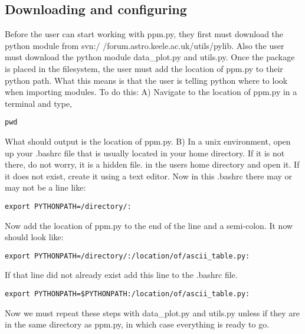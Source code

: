 \subsection{Downloading and configuring}
Before the user can start working with ppm.py, they first must download the python 
module from svn:/ /forum.astro.keele.ac.uk/utils/pylib.  Also the user must download the python module data\_plot.py and utils.py. Once the package is placed in the filesystem, the user must add the location
of ppm.py to their python path.  What this means is that the user is telling python where to look when importing modules.
To do this:
\newline
A) Navigate to the location of ppm.py in a terminal and type,

\begin{verbatim}
pwd
\end{verbatim}

What should output is the location of ppm.py.
\newline
B) In a unix environment, open up your .bashrc file that is usually located in your home directory.  If it is not there, do not worry, it is a hidden file.
in the users home directory and open it.  If it does not exist, create it using a text editor.
Now in this .bashrc there may or may not be a line like:

\begin{verbatim}
export PYTHONPATH=/directory/:
\end{verbatim}

Now add the location of ppm.py to the end of the line and a semi-colon.  It now should look like:

\begin{verbatim}
export PYTHONPATH=/directory/:/location/of/ascii_table.py:
\end{verbatim}

If that line did not already exist add this line to the .bashrc file.

\begin{verbatim}
export PYTHONPATH=$PYTHONPATH:/location/of/ascii_table.py:
\end{verbatim}

Now we must repeat these steps with data\_plot.py and utils.py unless if they are in the same directory as ppm.py, in which case everything is ready to go.


